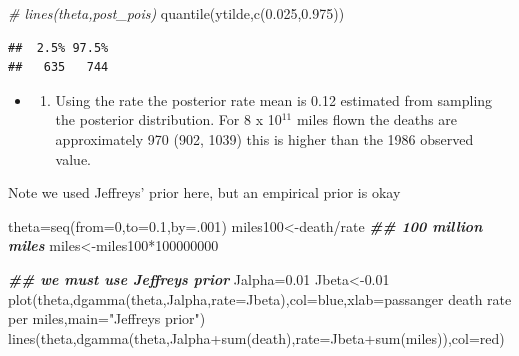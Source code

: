 \documentclass[
]{book}
\newenvironment{Shaded}{\begin{snugshade}}{\end{snugshade}}
\newcommand{\AttributeTok}[1]{\textcolor[rgb]{0.77,0.63,0.00}{#1}}
\newcommand{\CommentTok}[1]{\textcolor[rgb]{0.56,0.35,0.01}{\textit{#1}}}
\newcommand{\DecValTok}[1]{\textcolor[rgb]{0.00,0.00,0.81}{#1}}
\newcommand{\DocumentationTok}[1]{\textcolor[rgb]{0.56,0.35,0.01}{\textbf{\textit{#1}}}}
\newcommand{\FloatTok}[1]{\textcolor[rgb]{0.00,0.00,0.81}{#1}}
\newcommand{\FunctionTok}[1]{\textcolor[rgb]{0.00,0.00,0.00}{#1}}
\newcommand{\NormalTok}[1]{#1}
\newcommand{\OtherTok}[1]{\textcolor[rgb]{0.56,0.35,0.01}{#1}}
\newcommand{\SpecialCharTok}[1]{\textcolor[rgb]{0.00,0.00,0.00}{#1}}
\newcommand{\StringTok}[1]{\textcolor[rgb]{0.31,0.60,0.02}{#1}}
\providecommand{\tightlist}{%
  \setlength{\itemsep}{0pt}\setlength{\parskip}{0pt}}
\theoremstyle{definition}
\theoremstyle{definition}
\theoremstyle{definition}
\theoremstyle{definition}
\theoremstyle{remark}
\begin{document}
\begin{Shaded}
\begin{Highlighting}[]
\CommentTok{\# lines(theta,post\_pois)}
 \FunctionTok{quantile}\NormalTok{(ytilde,}\FunctionTok{c}\NormalTok{(}\FloatTok{0.025}\NormalTok{,}\FloatTok{0.975}\NormalTok{))}
\end{Highlighting}
\end{Shaded}

\begin{verbatim}
##  2.5% 97.5% 
##   635   744
\end{verbatim}

\begin{itemize}
\item
  \begin{enumerate}
  \def\labelenumi{(\alph{enumi})}
  \setcounter{enumi}{3}
  \tightlist
  \item
    Using the rate the posterior rate mean is 0.12 estimated from sampling the posterior distribution. For 8 x 10\(^11\) miles flown the deaths are approximately 970 (902, 1039) this is higher than the 1986 observed value.
  \end{enumerate}
\end{itemize}

Note we used Jeffreys' prior here, but an empirical prior is okay

\begin{Shaded}
\begin{Highlighting}[]
\NormalTok{  theta}\OtherTok{=}\FunctionTok{seq}\NormalTok{(}\AttributeTok{from=}\DecValTok{0}\NormalTok{,}\AttributeTok{to=}\FloatTok{0.1}\NormalTok{,}\AttributeTok{by=}\NormalTok{.}\DecValTok{001}\NormalTok{)}
\NormalTok{ miles100}\OtherTok{\textless{}{-}}\NormalTok{death}\SpecialCharTok{/}\NormalTok{rate }\DocumentationTok{\#\# 100 million miles}
\NormalTok{ miles}\OtherTok{\textless{}{-}}\NormalTok{miles100}\SpecialCharTok{*}\DecValTok{100000000}

 


   
  \DocumentationTok{\#\# we must use Jeffreys\textquotesingle{} prior}
\NormalTok{    Jalpha}\OtherTok{=}\FloatTok{0.01}
\NormalTok{  Jbeta}\OtherTok{\textless{}{-}}\FloatTok{0.01}
 \FunctionTok{plot}\NormalTok{(theta,}\FunctionTok{dgamma}\NormalTok{(theta,Jalpha,}\AttributeTok{rate=}\NormalTok{Jbeta),}\AttributeTok{col=}\StringTok{\textquotesingle{}blue\textquotesingle{}}\NormalTok{,}\AttributeTok{xlab=}\StringTok{\textquotesingle{}passanger death rate per miles\textquotesingle{}}\NormalTok{,}\AttributeTok{main=}\StringTok{"Jeffreys\textquotesingle{} prior"}\NormalTok{)}
\FunctionTok{lines}\NormalTok{(theta,}\FunctionTok{dgamma}\NormalTok{(theta,Jalpha}\SpecialCharTok{+}\FunctionTok{sum}\NormalTok{(death),}\AttributeTok{rate=}\NormalTok{Jbeta}\SpecialCharTok{+}\FunctionTok{sum}\NormalTok{(miles)),}\AttributeTok{col=}\StringTok{\textquotesingle{}red\textquotesingle{}}\NormalTok{)}
\end{Highlighting}
\end{Shaded}
\end{document}
